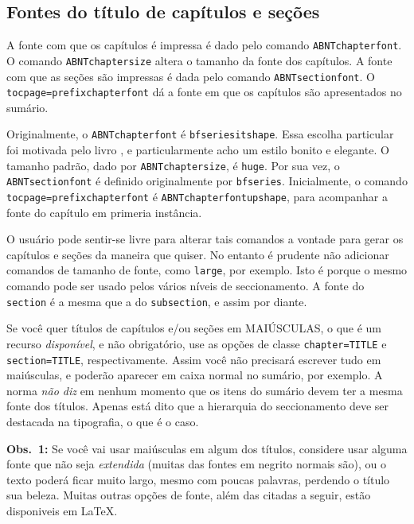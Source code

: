\documentclass[espaco=simples,appendix=Name]{abnt}
\newcommand{\bs}{\symbol{92}}   %
\begin{document}
\subsection{Fontes do título de capítulos e seções}
   \label{subsubsec: fontes de titulos de secoes}
   
A fonte com que os capítulos é impressa é dado pelo comando
\texttt{\bs ABNTchapterfont}. O comando \texttt{\bs ABNTchaptersize} altera
o tamanho da fonte dos capítulos. A fonte com que as seções são impressas é
dada pelo comando \texttt{\bs ABNTsectionfont}. O
\texttt{\bs tocpage=prefixchapterfont} dá a fonte em que os capítulos são
apresentados no sumário.

Originalmente, o \texttt{\bs ABNTchapterfont} é
\texttt{\bs bfseries\bs itshape}. Essa escolha particular foi motivada pelo 
livro \cite{desktop-publishing}, e particularmente acho um estilo bonito e
elegante. O tamanho padrão, dado por \texttt{\bs ABNTchaptersize}, é
\texttt{\bs huge}.  Por sua vez, o \texttt{\bs ABNTsectionfont} é definido
originalmente por \texttt{\bs bfseries}. Inicialmente, o comando 
\texttt{\bs tocpage=prefixchapterfont} é \texttt{\bs ABNTchapterfont\bs upshape},
para acompanhar a fonte do capítulo em primeria instância. 

O usuário pode sentir-se livre para alterar tais comandos a vontade para
gerar os capítulos e seções da maneira que quiser. No entanto é prudente
não adicionar comandos de tamanho de fonte, como \texttt{\bs large},
por exemplo. Isto é porque o mesmo comando pode ser usado pelos vários
níveis de seccionamento. A fonte do \texttt{\bs section} é a mesma que a do
\texttt{\bs subsection}, e assim por diante.

Se você quer títulos de capítulos e/ou seções em
MAIÚSCULAS, o que é um
recurso \emph{disponível}, e não obrigatório, use as opções
de classe \texttt{chapter=TITLE} e \texttt{section=TITLE}, respectivamente. Assim você
não precisará escrever tudo em maiúsculas, e poderão aparecer em caixa
normal no sumário, por exemplo. A norma \emph{não diz} em nenhum momento
que os itens do sumário devem ter a mesma fonte dos títulos. Apenas está
dito que a hierarquia do seccionamento deve ser destacada na tipografia, o
que é o caso.

\textbf{Obs.~1:} Se você
vai usar maiúsculas em algum dos títulos, considere usar alguma fonte que
não seja \emph{extendida} (muitas das fontes em negrito normais são), ou o
texto poderá ficar muito largo, mesmo com poucas palavras, perdendo o
título sua beleza. Muitas outras opções de fonte, além das citadas a
seguir, estão disponiveis em \LaTeX.
\end{document}
